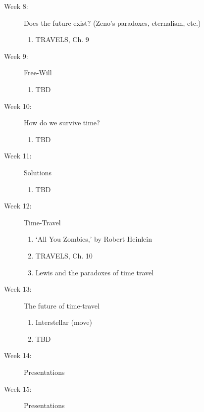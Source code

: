 \documentclass[article,oneside]{memoir}
\begin{document}
\begin{description}
\item[Week 8:] Does the future exist? (Zeno's paradoxes, eternalism, etc.)
\begin{enumerate}
\item TRAVELS, Ch. 9
\end{enumerate}

\item[Week 9:] Free-Will
\begin{enumerate}
\item TBD
\end{enumerate}

\item[Week 10:] How do we survive time? 
\begin{enumerate}
\item TBD
\end{enumerate}

\item[Week 11:] Solutions 
\begin{enumerate}
\item TBD
\end{enumerate}

\item[Week 12:]  Time-Travel
\begin{enumerate}
\item `All You Zombies,' by Robert Heinlein
\item TRAVELS, Ch. 10 
\item Lewis and the paradoxes of time travel
\end{enumerate}

\item[Week 13:]  The future of time-travel
\begin{enumerate}
\item Interstellar (move)
\item TBD
\end{enumerate}

\item[Week 14:] Presentations





\item[Week 15:] Presentations
 \end{description}
\end{document}
